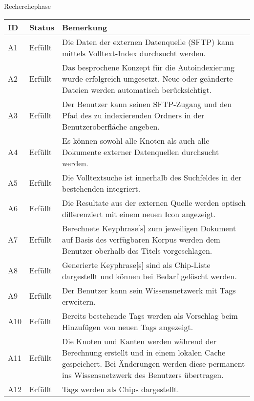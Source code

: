 


Recherchephase


\begin{longtable}{|p{1.5cm} | p{1.5cm} | p{8.1cm}|}
  \hline
    ID & Status & Bemerkung \\\hline
    A1 & Erfüllt & Die Daten der externen Datenquelle (\gls{SFTP}) kann mittels Volltext-Index durchsucht werden.\\\hline
    A2 & Erfüllt & Das besprochene Konzept für die Autoindexierung wurde erfolgreich umgesetzt. Neue oder geänderte Dateien werden automatisch berücksichtigt.\\\hline
    A3 & Erfüllt & Der Benutzer kann seinen \gls{SFTP}-Zugang und den Pfad des zu indexierenden Ordners in der Benutzeroberfläche angeben. \\\hline
    A4 & Erfüllt & Es können sowohl alle Knoten als auch alle Dokumente externer Datenquellen durchsucht werden. \\\hline
    A5 & Erfüllt & Die Volltextsuche ist innerhalb des Suchfeldes in der bestehenden integriert. \\\hline
    A6 & Erfüllt & Die Resultate aus der externen Quelle werden optisch differenziert mit einem neuen Icon angezeigt. \\\hline
    A7 & Erfüllt & Berechnete \gls{Keyphrase}[s] zum jeweiligen Dokument auf Basis des verfügbaren Korpus werden dem Benutzer oberhalb des Titels vorgeschlagen. \\\hline
    A8 & Erfüllt & Generierte \gls{Keyphrase}[s] sind als Chip-Liste dargestellt und können bei Bedarf gelöscht werden.\\\hline
    A9 & Erfüllt & Der Benutzer kann sein Wissensnetzwerk mit Tags erweitern.\\\hline
    A10 & Erfüllt & Bereits bestehende Tags werden als Vorschlag beim Hinzufügen von neuen Tags angezeigt.\\\hline
    A11 & Erfüllt & Die Knoten und Kanten werden während der Berechnung erstellt und in einem lokalen Cache gespeichert. Bei Änderungen werden diese permanent ins Wissensnetzwerk des Benutzers übertragen.\\\hline
    A12 & Erfüllt & Tags werden als Chips dargestellt.\\\hline

\end{longtable}
